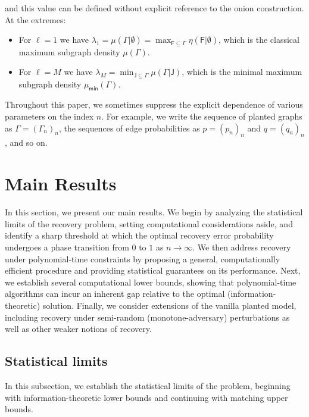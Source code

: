 \documentclass[12pt]{article}
\newcommand{\s}[1]{\mathsf{#1}}
\begin{document}
and this value can be defined without explicit reference to the onion construction. At the extremes:
\begin{itemize}
    \item For $\ell=1$ we have $\lambda_1=\mu(\Gamma\vert\emptyset)=\max_{\s{F}\subseteq\Gamma}\eta(\s{F}\vert\emptyset)$, which is the classical maximum subgraph density $\mu(\Gamma)$.
    \item For $\ell=M$ we have $\lambda_M=\min_{\s{J}\subseteq\Gamma}\mu(\Gamma\vert\s{J})$, which is the minimal maximum subgraph density $\mu_{\s{min}}(\Gamma)$.
\end{itemize}
Throughout this paper, we sometimes suppress the explicit dependence of various parameters on the index $n$. For example, we write the sequence of planted graphs as $\Gamma = (\Gamma_n)_n$, the sequences of edge probabilities as $p = (p_n)_n$ and $q = (q_n)_n$, and so on.

\section{Main Results}\label{sec:mainresults}

In this section, we present our main results. We begin by analyzing the statistical limits of the recovery problem, setting computational considerations aside, and identify a sharp threshold at which the optimal recovery error probability undergoes a phase transition from $0$ to $1$ as $n\to\infty$. We then address recovery under polynomial-time constraints by proposing a general, computationally efficient procedure and providing statistical guarantees on its performance. Next, we establish several computational lower bounds, showing that polynomial-time algorithms can incur an inherent gap relative to the optimal (information-theoretic) solution. Finally, we consider extensions of the vanilla planted model, including recovery under semi-random (monotone-adversary) perturbations as well as other weaker notions of recovery.


\subsection{Statistical limits}

In this subsection, we establish the statistical limits of the problem, beginning with information-theoretic lower bounds and continuing with matching upper bounds.
\end{document}
